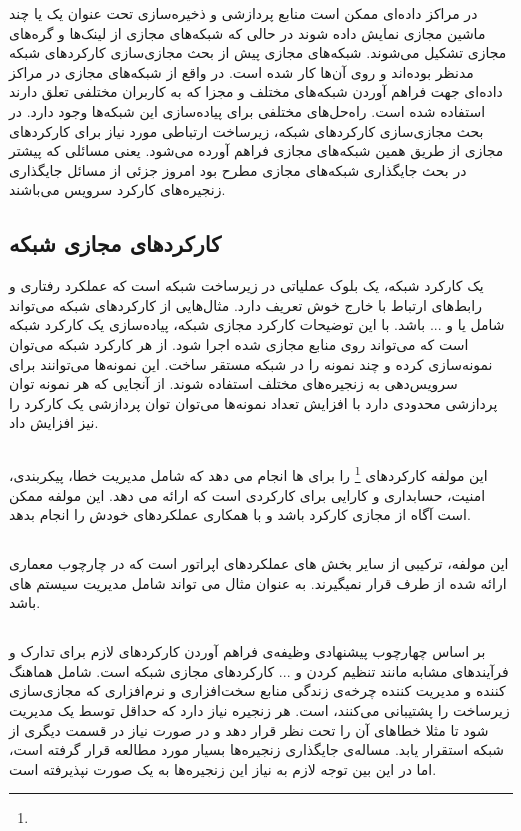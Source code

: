 در مراکز داده‌ای ممکن است منابع پردازشی و ذخیره‌سازی تحت عنوان یک یا چند
ماشین مجازی نمایش داده شوند در حالی که شبکه‌های مجازی از لینک‌ها و گره‌های مجازی تشکیل می‌شوند.
شبکه‌های مجازی پیش از بحث مجازی‌سازی کارکردهای شبکه مدنظر بوده‌اند و روی آن‌ها کار شده است.
در واقع از شبکه‌های مجازی در مراکز داده‌ای جهت فراهم آوردن شبکه‌های مختلف و مجزا که به کاربران مختلفی تعلق دارند
استفاده شده است. راه‌حل‌های مختلفی برای پیاده‌سازی این شبکه‌ها وجود دارد. در بحث مجازی‌سازی کارکردهای شبکه‌، زیرساخت ارتباطی
مورد نیاز 
برای کارکردهای مجازی از طریق همین شبکه‌های مجازی فراهم آورده می‌شود.
یعنی مسائلی که پیشتر در بحث جایگذاری شبکه‌های مجازی مطرح بود
امروز جزئی از مسائل جایگذاری زنجیره‌های کارکرد سرویس می‌باشند.

\subsection{کارکردهای مجازی شبکه}
یک کارکرد شبکه، یک بلوک عملیاتی در زیرساخت شبکه است که عملکرد رفتاری و رابط‌های ارتباط با خارج خوش تعریف دارد.
مثال‌هایی از کارکردهای شبکه می‌تواند شامل
یا
و ... باشد.
با این توضیحات کارکرد مجازی شبکه، پیاده‌سازی یک کارکرد شبکه است
که می‌تواند روی منابع مجازی شده اجرا شود.
از هر کارکرد شبکه می‌توان نمونه‌سازی کرده و چند نمونه را در شبکه مستقر ساخت. 
این نمونه‌ها می‌توانند برای سرویس‌دهی به زنجیره‌های مختلف استفاده شوند. از آنجایی که 
هر نمونه توان پردازشی محدودی دارد با افزایش تعداد نمونه‌ها می‌توان توان پردازشی یک کارکرد را نیز افزایش داد.

\subsection{}
این مولفه کارکردهای \footnote{} را برای  ها انجام می دهد که شامل مدیریت خطا، پیکربندی، امنیت، حسابداری و کارایی برای کارکردی است که  ارائه می دهد. این مولفه ممکن است آگاه از مجازی کارکرد باشد و با همکاری  عملکردهای خودش را انجام بدهد.

\subsection{}
این مولفه، ترکیبی از سایر بخش های عملکردهای اپراتور است که در چارچوب معماری  ارائه شده از طرف  قرار نمیگیرند. به عنوان مثال می تواند شامل مدیریت سیستم های  باشد.

\subsection{}
بر اساس چهارچوب پیشنهادی 
وظیفه‌ی  فراهم آوردن کارکردهای لازم
برای تدارک و فرآیند‌های مشابه مانند تنظیم کردن و ... کارکردهای مجازی شبکه است.
 شامل هماهنگ کننده و مدیریت کننده چرخه‌ی زندگی
منابع سخت‌افزاری و نرم‌افزاری که مجازی‌سازی زیرساخت را پشتیبانی می‌کنند، است.
هر زنجیره نیاز دارد که حداقل توسط یک  مدیریت شود
تا مثلا خطاهای آن را تحت نظر قرار دهد و در صورت نیاز در قسمت دیگری از شبکه استقرار یابد.
مساله‌ی جایگذاری زنجیره‌ها بسیار مورد مطالعه قرار گرفته است، اما در این بین توجه لازم به نیاز این زنجیره‌ها به یک
صورت نپذیرفته است.

